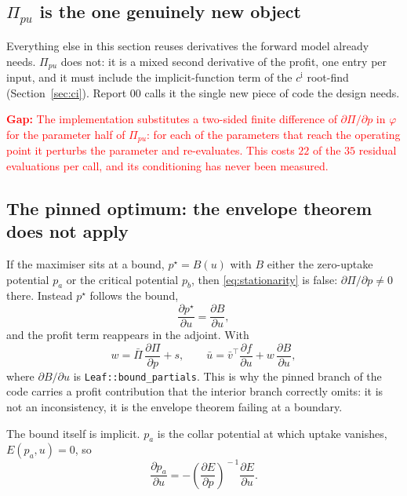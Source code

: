 \documentclass[11pt,a4paper]{article}
\newcommand{\code}[1]{\texttt{\small #1}}
\newcommand{\adj}[1]{\bar{#1}}
\newcommand{\dd}[2]{\frac{\partial #1}{\partial #2}}
\newcommand{\gap}[1]{\textcolor{red}{\textbf{Gap:} #1}}
\begin{document}
\subsection{$\Pi_{pu}$ is the one genuinely new object}

Everything else in this section reuses derivatives the forward model already
needs. $\Pi_{pu}$ does not: it is a mixed second derivative of the profit, one
entry per input, and it must include the implicit-function term of the
$c^{\mathrm{i}}$ root-find (Section~\ref{sec:ci}). Report 00 calls it the single
new piece of code the design needs.

\gap{The implementation substitutes a two-sided finite difference of
$\partial \Pi/\partial p$ in $\varphi$ for the parameter half of $\Pi_{pu}$: for
each of the parameters that reach the operating point it perturbs the parameter and
re-evaluates. This costs $22$ of the $35$ residual evaluations per call, and its
conditioning has never been measured.}

\subsection{The pinned optimum: the envelope theorem does not apply}

If the maximiser sits at a bound, $p^\star = B(u)$ with $B$ either the
zero-uptake potential $p_a$ or the critical potential $p_b$, then
\eqref{eq:stationarity} is false: $\partial \Pi/\partial p \ne 0$ there. Instead
$p^\star$ follows the bound,
\begin{equation}
\dd{p^\star}{u} = \dd{B}{u},
\label{eq:pinnedsens}
\end{equation}
and the profit term reappears in the adjoint. With
\begin{equation}
w = \adj\Pi \, \dd{\Pi}{p} + s ,
\qquad
\adj u = \adj{v}^{\!\top}\dd{f}{u} + w \, \dd{B}{u},
\label{eq:pinnedadj}
\end{equation}
where $\partial B/\partial u$ is \code{Leaf::bound\_partials}. This is why the
pinned branch of the code carries a profit contribution that the interior branch
correctly omits: it is not an inconsistency, it is the envelope theorem failing at
a boundary.

The bound itself is implicit. $p_a$ is the collar potential at which uptake
vanishes, $E(p_a, u) = 0$, so
\begin{equation}
\dd{p_a}{u} = -\left(\dd{E}{p}\right)^{\!-1} \dd{E}{u} .
\label{eq:bounda}
\end{equation}
\end{document}
